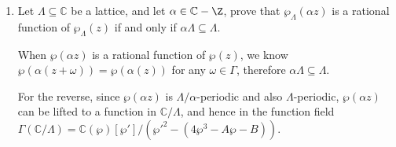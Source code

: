 \begin{enumerate}
\begin{proofc}[解答]
        Therefore, the fixing group of $\mathbb{C}(j, j_N)$ is $\Gamma_0(N)$.

        (ii)

        We have already verified $j_N \in \mathbb{C}(\Gamma_0(N))$, then $\mathbb{C}(j,j_N) \subseteq \mathbb{C}(\Gamma_0(N))$, 
        by the reverse inclusion, $$\ker \theta = \{ \text{the fixing group of } \mathbb{C}(\Gamma_0(N))\} \subseteq \{ \text{the fixing group of } \mathbb{C}(j,j_N)\}.$$

        (iii)

        Because the modular curve $X_0(N) = \mathbb{H} / \Gamma_0(N)$, $\Gamma_0(N)$ acts trivially on $X_0(N)$, therefore $\Gamma_0(N) \subseteq \ker \theta$.

        (iv)

        Combine (i),(ii),(iii), we know that all the $\subseteq$ should be $=$.
        Then consider the fixing field $\mathbb{C}(X_0(N))^{\mathrm{SL}_2(\Z)/\ker \theta} = \mathbb{C}(j)$, by Galois Theory, $\mathbb{C}(X_0(N)) / \mathbb{C}(j)$ is a Galois extension
        with Galois group $\mathrm{SL}_2(\Z)/\ker \theta = \mathrm{SL}_2(\Z)/\Gamma_0(N)$.

        Similarly we have $\mathbb{C}(j, j_N) / \mathbb{C}(j)$ is also Galois with Galois group $\mathrm{SL}_2(\Z)/\Gamma_0(N)$, 
        then by Galois correspondence $\mathbb{C}(j,j_N) = \mathbb{C}(\Gamma_0(N))$.


    \end{proofc}
    
    


    \item Let $\Lambda\subseteq \mathbb{C}$ be a lattice, and let $\alpha \in \mathbb{C} -\Z$, prove that $\wp_{\Lambda}(\alpha z)$ is a 
    rational function of $\wp_{\Lambda}(z)$ if and only if $\alpha \Lambda \subseteq \Lambda$.

    \begin{proofc}[解答]

    When $\wp(\alpha z)$ is a rational function of $\wp(z)$, we know $\wp(\alpha(z+\omega)) = \wp(\alpha(z))$ for any $\omega \in \Gamma$, 
    therefore $\alpha \Lambda \subseteq \Lambda$.

    For the reverse, since $\wp(\alpha z)$ is $\Lambda/\alpha$-periodic and also $\Lambda$-periodic, $\wp(\alpha z)$ can be 
    lifted to a function in $\mathbb{C} / \Lambda$, and hence in the function field $\Gamma(\mathbb{C} / \Lambda) = \mathbb{C} (\wp) [\wp']/(\wp'^2 - (4\wp^3-A\wp-B))$.


\end{proofc}
\end{enumerate}
